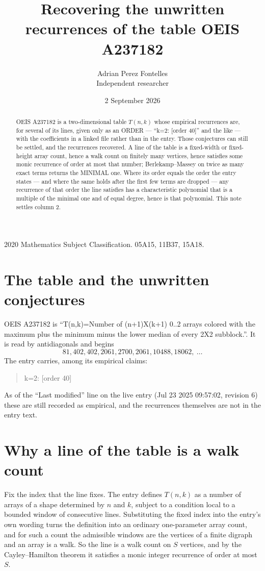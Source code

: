 \documentclass[11pt,a4paper]{article}
\title{Recovering the unwritten recurrences of the table OEIS A237182}
\author{Adrian Perez Fontelles\\ \small Independent researcher}
\date{2 September 2026}
\theoremstyle{plain}
\theoremstyle{definition}
\begin{document}
\maketitle

\begin{abstract}
OEIS A237182 is a two-dimensional table $T(n,k)$ whose empirical recurrences are, for several of
its lines, given only as an ORDER --- ``k=2: [order 40]'' and the like --- with the
coefficients in a linked file rather than in the entry. Those conjectures can still be settled,
and the recurrences recovered. A line of the table is a fixed-width or fixed-height array
count, hence a walk count on finitely many vertices, hence satisfies some monic recurrence of
order at most that number; Berlekamp--Massey on twice as many exact terms returns the MINIMAL
one. Where its order equals the order the entry states --- and where the same holds after the
first few terms are dropped --- any recurrence of that order the line satisfies has a
characteristic polynomial that is a multiple of the minimal one and of equal degree, hence is
that polynomial. This note settles column 2.
\end{abstract}

\noindent\small 2020 Mathematics Subject Classification. 05A15, 11B37, 15A18.\normalsize

\section{The table and the unwritten conjectures}

OEIS A237182 is ``T(n,k)=Number of (n+1)X(k+1) 0..2 arrays colored with the maximum plus the minimum minus the lower median of every 2X2 subblock.''. It is read by antidiagonals and begins
\[
81, 402, 402, 2061, 2700, 2061, 10488, 18062,\ \dots
\]
The entry carries, among its empirical claims:
\begin{quote}\small
k=2: [order 40]
\end{quote}
As of the ``Last modified'' line on the live entry (Jul 23 2025 09:57:02, revision 6) these are still
recorded as empirical, and the recurrences themselves are not in the entry text.

\section{Why a line of the table is a walk count}

Fix the index that the line fixes. The entry defines $T(n,k)$ as a number of arrays of a shape
determined by $n$ and $k$, subject to a condition local to a bounded window of consecutive
lines. Substituting the fixed index into the entry's own wording turns the definition into an
ordinary one-parameter array count, and for such a count the admissible windows are the
vertices of a finite digraph and an array is a walk. So the line is a walk count on $S$
vertices, and by the Cayley--Hamilton theorem it satisfies a monic integer recurrence of order
at most $S$.
\end{document}
